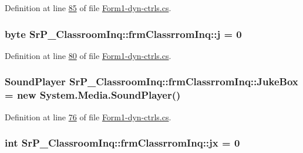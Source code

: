 \-Definition at line \hyperlink{_form1-dyn-ctrls_8cs_source_l00085}{85} of file \hyperlink{_form1-dyn-ctrls_8cs_source}{\-Form1-\/dyn-\/ctrls.\-cs}.

\hypertarget{class_sr_p___classroom_inq_1_1frm_classrrom_inq_a2eb87c50d0e2c90c1256a6e26cc8a651}{
\subsubsection[{j}]{\setlength{\rightskip}{0pt plus 5cm}byte {\bf \-Sr\-P\-\_\-\-Classroom\-Inq\-::frm\-Classrrom\-Inq\-::j} = 0}}
\label{class_sr_p___classroom_inq_1_1frm_classrrom_inq_a2eb87c50d0e2c90c1256a6e26cc8a651}


\-Definition at line \hyperlink{_form1-dyn-ctrls_8cs_source_l00080}{80} of file \hyperlink{_form1-dyn-ctrls_8cs_source}{\-Form1-\/dyn-\/ctrls.\-cs}.

\hypertarget{class_sr_p___classroom_inq_1_1frm_classrrom_inq_a10f0b7ba2800c1353aeee71344d08a94}{
\subsubsection[{\-Juke\-Box}]{\setlength{\rightskip}{0pt plus 5cm}\-Sound\-Player {\bf \-Sr\-P\-\_\-\-Classroom\-Inq\-::frm\-Classrrom\-Inq\-::\-Juke\-Box} = new \-System.\-Media.\-Sound\-Player()}}
\label{class_sr_p___classroom_inq_1_1frm_classrrom_inq_a10f0b7ba2800c1353aeee71344d08a94}


\-Definition at line \hyperlink{_form1-dyn-ctrls_8cs_source_l00076}{76} of file \hyperlink{_form1-dyn-ctrls_8cs_source}{\-Form1-\/dyn-\/ctrls.\-cs}.

\hypertarget{class_sr_p___classroom_inq_1_1frm_classrrom_inq_a6206484c9b4d5d7558f8904cad77cded}{
\subsubsection[{jx}]{\setlength{\rightskip}{0pt plus 5cm}int {\bf \-Sr\-P\-\_\-\-Classroom\-Inq\-::frm\-Classrrom\-Inq\-::jx} = 0}}
\label{class_sr_p___classroom_inq_1_1frm_classrrom_inq_a6206484c9b4d5d7558f8904cad77cded}


